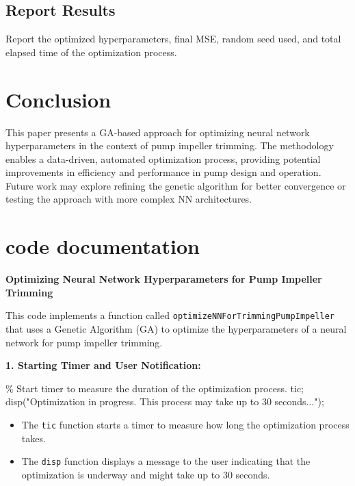 \documentclass[
]{agujournal2019}
\newenvironment{Shaded}{\begin{snugshade}}{\end{snugshade}}
\newcommand{\CommentTok}[1]{\textcolor[rgb]{0.37,0.37,0.37}{#1}}
\newcommand{\NormalTok}[1]{\textcolor[rgb]{0.00,0.23,0.31}{#1}}
\newcommand{\OperatorTok}[1]{\textcolor[rgb]{0.37,0.37,0.37}{#1}}
\newcommand{\StringTok}[1]{\textcolor[rgb]{0.13,0.47,0.30}{#1}}
\newcommand{\VariableTok}[1]{\textcolor[rgb]{0.07,0.07,0.07}{#1}}
\providecommand{\tightlist}{%
  \setlength{\itemsep}{0pt}\setlength{\parskip}{0pt}}\usepackage{longtable,booktabs,array}
\begin{document}
\subsection{Report Results}\label{report-results}

Report the optimized hyperparameters, final MSE, random seed used, and
total elapsed time of the optimization process.

\section{Conclusion}\label{conclusion}

This paper presents a GA-based approach for optimizing neural network
hyperparameters in the context of pump impeller trimming. The
methodology enables a data-driven, automated optimization process,
providing potential improvements in efficiency and performance in pump
design and operation. Future work may explore refining the genetic
algorithm for better convergence or testing the approach with more
complex NN architectures.

\section{code documentation}\label{code-documentation}

\textbf{Optimizing Neural Network Hyperparameters for Pump Impeller
Trimming}

This code implements a function called
\texttt{optimizeNNForTrimmingPumpImpeller} that uses a Genetic Algorithm
(GA) to optimize the hyperparameters of a neural network for pump
impeller trimming.

\textbf{1. Starting Timer and User Notification:}

\begin{Shaded}
\begin{Highlighting}[]
    \CommentTok{\% Start timer to measure the duration of the optimization process.}
    \VariableTok{tic}\OperatorTok{;}
    \VariableTok{disp}\NormalTok{(}\StringTok{"Optimization in progress. This process may take up to 30 seconds..."}\NormalTok{)}\OperatorTok{;}
\end{Highlighting}
\end{Shaded}

\begin{itemize}
\tightlist
\item
  The \texttt{tic} function starts a timer to measure how long the
  optimization process takes.
\item
  The \texttt{disp} function displays a message to the user indicating
  that the optimization is underway and might take up to 30 seconds.
\end{itemize}
\end{document}
